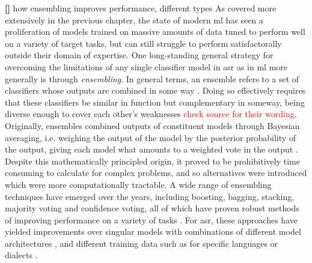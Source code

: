 \documentclass[thesis]{cluu}
\newcounter{paranum}
\newcommand{\numberedparagraph}{\par\refstepcounter{paranum}\textbf{[\theparanum] }}
\newcommand{\todo}[1]{\textcolor{red}{#1}}
\begin{document}
\parencite[inter alia]{barteldsMakingMoreLittle2023,zhangL2GENNeuralPhoneme2022,kheirAutomaticPronunciationAssessment2023,thaiSyntheticDataAugmentation2019}
\numberedparagraph{how ensembling improves performance, different types}
As covered more extensively in the previous chapter, the state of modern \gls{ml} has seen a proliferation of models trained on massive amounts of data tuned to perform well on a variety of target tasks, but can still struggle to perform satisfactorally outside their domain of expertise. One long-standing general strategy for overcoming the limitations of any single classifier model in \gls{asr} as in \gls{ml} more generally is through \textit{ensembling}. In general terms, an ensemble refers to a set of classifiers whose outputs are combined in some way \parencite{dietterichEnsembleMethodsMachine2000}. Doing so effectively requires that these classifiers be similar in function but complementary in someway, being diverse enough to cover each other's weaknesses \parencite{hansenNeuralNetworkEnsembles1990}\todo{check source for their wording}. Originally, ensembles combined outputs of constituent models through Bayesian averaging, i.e. weighing the output of the model by the posterior probability of the output, giving each model what amounts to a weighted vote in the output \parencite{dietterichEnsembleMethodsMachine2000}. Despite this mathematically principled origin, it proved to be prohibitively time consuming to calculate for complex problems, and so alternatives were introduced which were more computationally tractable. A wide range of ensembling techniques have emerged over the years, including boosting, bagging, stacking, majority voting and confidence voting, all of which have proven robust methods of improving performance on a variety of tasks \parencite[see][inter alia]{maclinEmpiricalEvaluationBagging1997,dengScalableStackingLearning2012,fiscus1997post,gitmanConfidencebasedEnsemblesEndtoEnd2023}. For \gls{asr}, these approaches have yielded improvements over singular models with combinations of different model architectures \parencite{arunkumarInvestigationEnsembleFeatures2022,dengEnsembleDeepLearning2014}, and different training data such as for specific languages or dialects \parencite[inter alia]{agrawalLearningWhenTrust2023,gitmanConfidencebasedEnsemblesEndtoEnd2023}.
\end{document}
